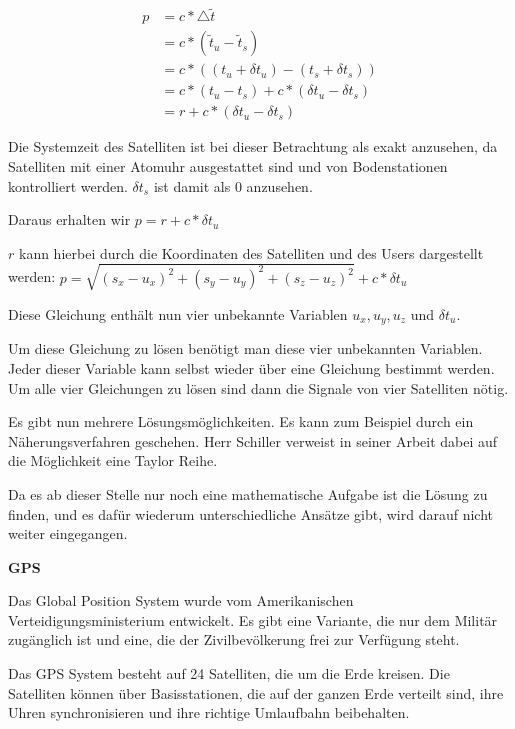 \glqq 
\begin{align}
p &= c * \bigtriangleup \tilde{t} \\
  &= c * (\tilde{t}_{u} - \tilde{t}_{s}) \\
  &= c * ((t_{u} + \delta t_{u}) - (t_{s} + \delta t_{s})) \\
  &= c * (t_{u} - t_{s}) + c * (\delta t_{u} - \delta t_{s}) \\
  &= r + c * (\delta t_{u} - \delta t_{s})
\end{align}
\grqq \cite[S. 190]{Schiller2004}

Die Systemzeit des Satelliten ist bei dieser Betrachtung als exakt anzusehen, da Satelliten mit einer Atomuhr ausgestattet sind und von Bodenstationen kontrolliert werden. $\delta t_{s}$ ist damit als 0 anzusehen.

Daraus erhalten wir $p = r + c * \delta t_{u}$

$r$ kann hierbei durch die Koordinaten des Satelliten und des Users dargestellt werden: $p = \sqrt{(s_{x} - u_{x})^{2} + (s_{y} - u_{y})^{2} + (s_{z}-u_{z})^{2}} + c * \delta t_{u}$

Diese Gleichung enthält nun vier unbekannte Variablen $u_{x}, u_{y}, u_{z}$ und $\delta t_{u}$. 

Um diese Gleichung zu lösen benötigt man diese vier unbekannten Variablen. Jeder dieser Variable kann selbst wieder über eine Gleichung bestimmt werden. Um alle vier Gleichungen zu lösen sind dann die Signale von vier Satelliten nötig. 

Es gibt nun mehrere Lösungsmöglichkeiten. Es kann zum Beispiel durch ein Näherungsverfahren geschehen. Herr Schiller verweist in seiner Arbeit dabei auf die Möglichkeit eine Taylor Reihe.

Da es ab dieser Stelle nur noch eine mathematische Aufgabe ist die Lösung zu finden, und es dafür wiederum unterschiedliche Ansätze gibt, wird darauf nicht weiter eingegangen.

\cite[S. 190]{Schiller2004}


\textbf{GPS}

Das Global Position System wurde vom Amerikanischen Verteidigungsministerium entwickelt. Es gibt eine Variante, die nur dem Militär zugänglich ist und eine, die der Zivilbevölkerung frei zur Verfügung steht. 

Das GPS System besteht auf 24 Satelliten, die um die Erde kreisen. Die Satelliten können über Basisstationen, die auf der ganzen Erde verteilt sind, ihre Uhren synchronisieren und ihre richtige Umlaufbahn beibehalten. 
\cite[S. 162]{Kuepper2005}


